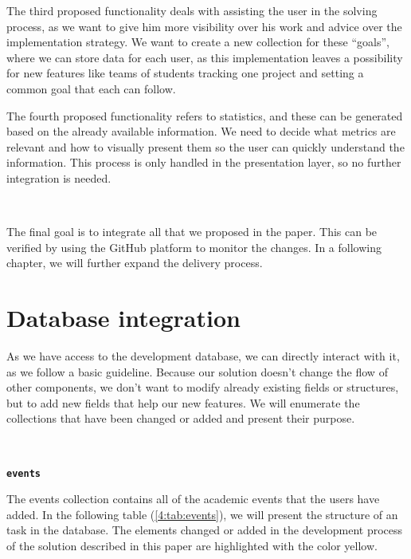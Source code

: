 The third proposed functionality deals with assisting the user in the solving process, as we want to give him more visibility over his work and advice over the implementation strategy. We want to create a new collection for these “goals”, where we can store data for each user, as this implementation leaves a possibility for new features like teams of students tracking one project and setting a common goal that each can follow. 

The fourth proposed functionality refers to statistics, and these can be generated based on the already available information. We need to decide what metrics are relevant and how to visually present them so the user can quickly understand the information. This process is only handled in the presentation layer, so no further integration is needed. 

~

The final goal is to integrate all that we proposed in the paper. This can be verified by using the GitHub platform to monitor the changes. In a following chapter, we will further expand the delivery process.


\section{Database integration} \label{4:database}

As we have access to the development database, we can directly interact with it, as we follow a basic guideline. Because our solution doesn’t change the flow of other components, we don’t want to modify already existing fields or structures, but to add new fields that help our new features.
We will enumerate the collections that have been changed or added and present their purpose.

~

\faDatabase \hspace{0.1cm} \textbf{\texttt{events}}

The events collection contains all of the academic events that the users have added. In the following table (\ref{4:tab:events}), we will present the structure of an task in the database. The elements changed or added in the development process of the solution described in this paper are highlighted with the color yellow.


